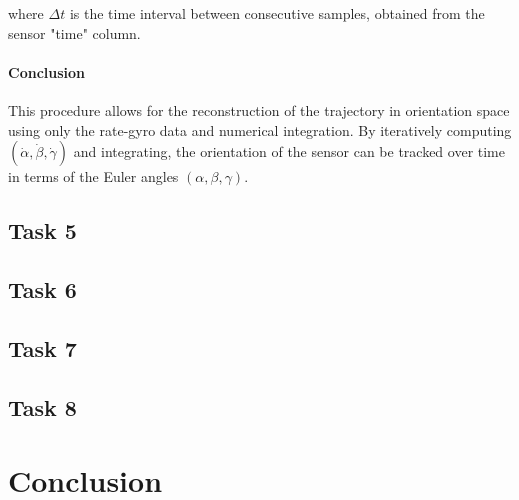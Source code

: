 \documentclass[12pt]{article}
\begin{document}
where \(\Delta t\) is the time interval between consecutive samples, obtained from the sensor "time" column.

\paragraph{Conclusion}

This procedure allows for the reconstruction of the trajectory in orientation space using only the rate-gyro data and numerical integration. By iteratively computing \((\dot{\alpha}, \dot{\beta}, \dot{\gamma})\) and integrating, the orientation of the sensor can be tracked over time in terms of the Euler angles \((\alpha, \beta, \gamma)\).




\subsection{Task 5}


\subsection{Task 6}


\subsection{Task 7}


\subsection{Task 8}

\section{Conclusion}






\appendix  
\clearpage
\addappheadtotoc 
\appendixpage 
\end{document}
